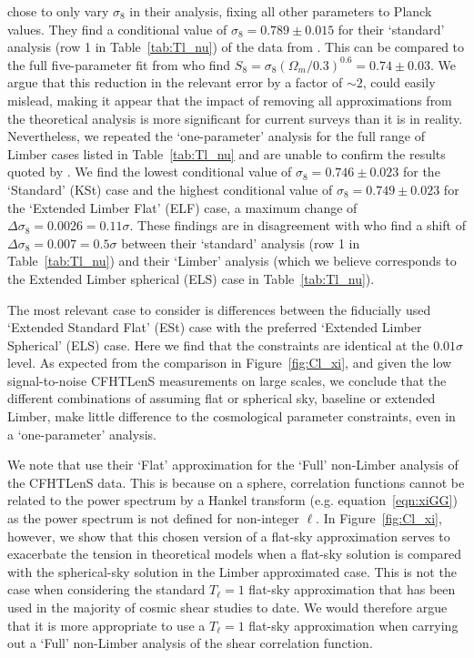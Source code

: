 \citet{kitching/etal:2016} chose to only vary $\sigma_8$ in their analysis, fixing all other parameters to Planck values. They find a conditional value of $\sigma_8 = 0.789 \pm 0.015$ for their `standard' analysis (row 1 in Table~\ref{tab:Tl_nu}) of the data from \citet{kilbinger/etal:2013}. This can be compared to the full five-parameter fit from \citet{kilbinger/etal:2013} who find $S_8=\sigma_8(\Omega_m/0.3)^{0.6} = 0.74 \pm 0.03$.   We argue that this reduction in the relevant error by a factor of $\sim 2$, could easily mislead, making it appear that the impact of removing all approximations from the theoretical analysis is more significant for current surveys than it is in reality.  Nevertheless, we repeated the `one-parameter' analysis for the full range of Limber cases listed in Table~\ref{tab:Tl_nu} and are unable to confirm the results quoted by \citet{kitching/etal:2016}.   We find the lowest conditional value of $\sigma_8 = 0.746 \pm 0.023$ for the `Standard' (KSt) case and the highest conditional value of $\sigma_8 = 0.749 \pm 0.023$ for the `Extended Limber Flat' (ELF) case, a maximum change of $\Delta \sigma_8 = 0.0026 = 0.11 \sigma$.  These findings are in disagreement with \citet{kitching/etal:2016} who find a shift of $\Delta \sigma_8 = 0.007 = 0.5\sigma$ between their `standard' analysis (row 1 in Table~\ref{tab:Tl_nu}) and their `Limber' analysis (which we believe corresponds to the Extended Limber spherical (ELS) case in Table~\ref{tab:Tl_nu}).  

The most relevant case to consider is differences between the fiducially used `Extended Standard Flat' (ESt) case with the preferred `Extended Limber Spherical' (ELS) case.  Here we find that the constraints are identical at the $0.01\sigma$ level.  As expected from the comparison in Figure~\ref{fig:Cl_xi}, and given the low signal-to-noise CFHTLenS measurements on large scales, we conclude that the different combinations of assuming flat or spherical sky, baseline or extended Limber, make little difference to the cosmological parameter constraints, even in a `one-parameter' analysis.    

We note that \citet{kitching/etal:2016} use their `Flat' approximation for the `Full' non-Limber analysis of the CFHTLenS data.   This is because on a sphere, correlation functions cannot be related to the power spectrum by a Hankel transform (e.g. equation~\ref{eqn:xiGG}) as the power spectrum is not defined for non-integer $\ell$.   In Figure~\ref{fig:Cl_xi}, however, we show that this chosen version of a flat-sky approximation serves to exacerbate the tension in theoretical models when a flat-sky solution is compared with the spherical-sky solution in the Limber approximated case.  This is not the case when considering the standard $T_\ell = 1$ flat-sky approximation that has been used in the majority of cosmic shear studies to date.  We would therefore argue that it is more appropriate to use a $T_\ell = 1$ flat-sky approximation when carrying out a `Full' non-Limber analysis of the shear correlation function.

